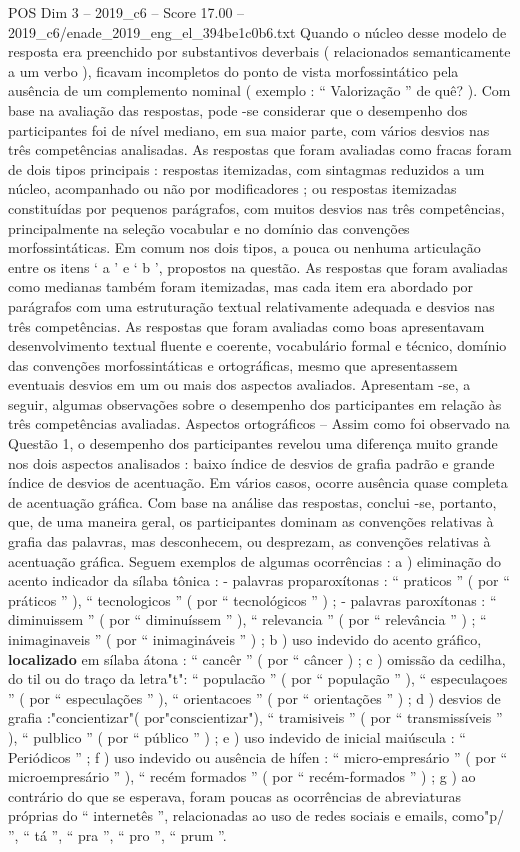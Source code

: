 \begin{textsample}{POS Dim 3 – 2019\_c6 – Score 17.00 – 2019\_c6/enade\_2019\_eng\_el\_394be1c0b6.txt}
Quando o núcleo desse modelo de resposta era preenchido por substantivos deverbais ( relacionados semanticamente a um verbo ), ficavam incompletos do ponto de vista morfossintático pela ausência de um complemento nominal ( exemplo : “ Valorização ” de quê? ).
Com base na avaliação das respostas, pode -se considerar que o desempenho dos participantes foi de nível mediano, em sua maior parte, com vários desvios nas três competências analisadas.
As respostas que foram avaliadas como fracas foram de dois tipos principais : respostas itemizadas, com sintagmas reduzidos a um núcleo, acompanhado ou não por modificadores ; ou respostas itemizadas constituídas por pequenos parágrafos, com muitos desvios nas três competências, principalmente na seleção vocabular e no domínio das convenções morfossintáticas.
Em comum nos dois tipos, a pouca ou nenhuma articulação entre os itens ‘ a ’ e ‘ b ’, propostos na questão.
As respostas que foram avaliadas como medianas também foram itemizadas, mas cada item era abordado por parágrafos com uma estruturação textual relativamente adequada e desvios nas três competências.
As respostas que foram avaliadas como boas apresentavam desenvolvimento textual fluente e coerente, vocabulário formal e técnico, domínio das convenções morfossintáticas e ortográficas, mesmo que apresentassem eventuais desvios em um ou mais dos aspectos avaliados.
Apresentam -se, a seguir, algumas observações sobre o desempenho dos participantes em relação às três competências avaliadas.
Aspectos ortográficos – Assim como foi observado na Questão 1, o desempenho dos participantes revelou uma diferença muito grande nos dois aspectos analisados : baixo índice de desvios de grafia padrão e grande índice de desvios de acentuação.
Em vários casos, ocorre ausência quase completa de acentuação gráfica.
Com base na análise das respostas, conclui -se, portanto, que, de uma maneira geral, os participantes dominam as convenções relativas à grafia das palavras, mas desconhecem, ou desprezam, as convenções relativas à acentuação gráfica.
Seguem exemplos de algumas ocorrências : a ) eliminação do acento indicador da sílaba tônica : - palavras proparoxítonas : “ praticos ” ( por “ práticos ” ), “ tecnologicos ” ( por “ tecnológicos ” ) ; - palavras paroxítonas : “ diminuissem ” ( por “ diminuíssem ” ), “ relevancia ” ( por “ relevância ” ) ; “ inimaginaveis ” ( por “ inimagináveis ” ) ; b ) uso indevido do acento gráfico, \textbf{localizado} em sílaba átona : “ cancêr ” ( por “ câncer ) ; c ) omissão da cedilha, do til ou do traço da letra"t": “ populacão ” ( por “ população ” ), “ especulaçoes ” ( por “ especulações ” ), “ orientacoes ” ( por “ orientações ” ) ; d ) desvios de grafia :"concientizar"( por"conscientizar"), “ tramisiveis ” ( por “ transmissíveis ” ), “ pulblico ” ( por “ público ” ) ; e ) uso indevido de inicial maiúscula : “ Periódicos ” ; f ) uso indevido ou ausência de hífen : “ micro-empresário ” ( por “ microempresário ” ), “ recém formados ” ( por “ recém-formados ” ) ; g ) ao contrário do que se esperava, foram poucas as ocorrências de abreviaturas próprias do “ internetês ”, relacionadas ao uso de redes sociais e emails, como"p/ ”, “ tá ”, “ pra ”, “ pro ”, “ prum ”.

\end{textsample}
